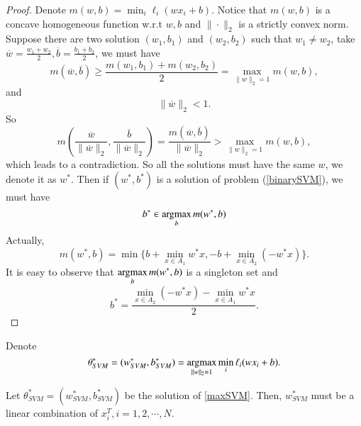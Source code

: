 \begin{proof}
	Denote $\displaystyle m(w,b) = \min_{i} \ell_i(wx_i+b)$. Notice that $m(w,b)$ is a concave homogeneous function w.r.t $w,b$ and $\|\cdot\|_2$ is a strictly convex norm. Suppose there are two solution $(w_1,b_1)$ and $(w_2,b_2)$ such that $w_1 \neq w_2$, take $\overline{w} = \frac{w_1 + w_2}{2}, \overline{b} = \frac{b_1 + b_2}{2}$, we must have
	\begin{equation}
		m(\overline{w},\overline{b}) \geq \frac{m(w_1,b_1)+ m(w_2,b_2)}{2} = \max_{\|w\|_2 = 1} m(w,b),
	\end{equation}
	and 
	\begin{equation}
		\|\overline{w}\|_2 < 1.
	\end{equation}
	So
	\begin{equation}
		m(\frac{\overline{w}}{\|\overline{w}\|_2},\frac{\overline{b}}{\|\overline{w}\|_2}) = \frac{m(\overline{w},\overline{b}) }{\|\overline{w}\|_2} > \max_{\|w\|_2 = 1} m(w,b),
	\end{equation}
	which leads to a contradiction. So all the solutions must have the same $w$, we denote it as $w^*$. Then if $(w^*,b^*)$ is a solution of problem (\ref{binarySVM}), we must have
	\begin{equation}
		b^* \in \mathop{\rm argmax}_{b} m(w^*,b)
	\end{equation}
	Actually,
	\begin{equation}
		m(w^*,b) = \min\{b+\min_{x\in A_1} w^*x, -b +\min_{x\in A_2} (-w^*x)\}.
	\end{equation}
	It is easy to observe that $\displaystyle \mathop{\rm argmax}_{b} m(w^*,b)$ is a singleton set and 
	\begin{equation}
		b^* = \frac{\min_{x\in A_2} (-w^*x) - \min_{x\in A_1} w^*x}{2}.
	\end{equation}
\end{proof}

Denote
\begin{equation}\label{maxSVM}
	\theta^*_{SVM} = (w_{SVM}^*,b_{SVM}^*) = \mathop{\rm argmax}_{\|w\|_2 = 1} \min_{i} \ell_i(wx_i+b).
\end{equation}


\begin{theorem}
	Let $\theta^*_{SVM} = (w_{SVM}^*,b_{SVM}^*) $ be the solution of \eqref{maxSVM}. Then, $w_{SVM}^*$ must be a linear combination of $x_i^T, i = 1,2,\cdots,N$.
\end{theorem}

